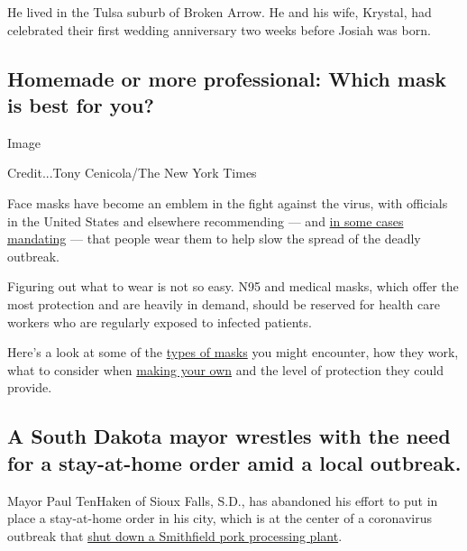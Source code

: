 He lived in the Tulsa suburb of Broken Arrow. He and his wife, Krystal,
had celebrated their first wedding anniversary two weeks before Josiah
was born.

\hypertarget{homemade-or-more-professional-which-mask-is-best-for-you}{%
\subsection{Homemade or more professional: Which mask is best for
you?}\label{homemade-or-more-professional-which-mask-is-best-for-you}}

Image

Credit...Tony Cenicola/The New York Times

Face masks have become an emblem in the fight against the virus, with
officials in the United States and elsewhere recommending --- and
\href{https://www.nytimes3xbfgragh.onion/2020/04/15/nyregion/coronavirus-face-masks-andrew-cuomo.html}{in
some cases mandating} --- that people wear them to help slow the spread
of the deadly outbreak.

Figuring out what to wear is not so easy. N95 and medical masks, which
offer the most protection and are heavily in demand, should be reserved
for health care workers who are regularly exposed to infected patients.

Here's a look at some of the
\href{https://www.nytimes3xbfgragh.onion/2020/04/10/well/live/coronavirus-face-masks-guides-protection-personal-protective-equipment.html}{types
of masks} you might encounter, how they work, what to consider when
\href{https://www.nytimes3xbfgragh.onion/article/how-to-make-face-mask-coronavirus.html}{making
your own} and the level of protection they could provide.

\hypertarget{a-south-dakota-mayor-wrestles-with-the-need-for-a-stay-at-home-order-amid-a-local-outbreak}{%
\subsection{A South Dakota mayor wrestles with the need for a
stay-at-home order amid a local
outbreak.}\label{a-south-dakota-mayor-wrestles-with-the-need-for-a-stay-at-home-order-amid-a-local-outbreak}}

Mayor Paul TenHaken of Sioux Falls, S.D., has abandoned his effort to
put in place a stay-at-home order in his city, which is at the center of
a coronavirus outbreak that
\href{https://www.nytimes3xbfgragh.onion/2020/04/15/us/coronavirus-south-dakota-meat-plant-refugees.html}{shut
down a Smithfield pork processing plant}.

